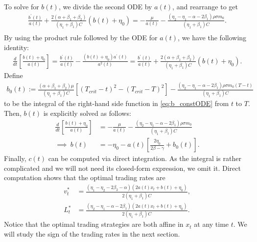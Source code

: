 \documentclass[12pt, letterpaper]{article}
\numberwithin{equation}{section}
\numberwithin{theorem}{section}
\begin{document}
To solve for $b(t)$, we divide the second ODE by $a(t)$,  and rearrange to get
\begin{equation}\label{eq:b_constODE}
	\begin{aligned} 
		\frac{b^\prime(t)}{a(t)}+\frac{2(\alpha+\beta_1+\beta_2)}{(\eta_1+\beta_1)C}(b(t)+\eta_0)=-\frac{\mu}{a(t)}-\frac{(\eta_2-\eta_1-\alpha-2\beta_1)\rho\sigma m_0}{(\eta_1+\beta_1)C}.\\
	\end{aligned}
\end{equation}
By using the product rule followed by the ODE for $a(t)$, we have the following identity:
\begin{equation}\label{eq:ODE_id}
	\begin{aligned} 
		\frac{d}{dt}\left[\frac{b(t)+\eta_0}{a(t)}\right]=\frac{b^\prime(t)}{a(t)}-\frac{\left(b(t)+\eta_0\right)a^\prime(t)}{a^2(t)}=\frac{b^\prime(t)}{a(t)}+\frac{2(\alpha+\beta_1+\beta_2)}{(\eta_1+\beta_1)C}(b(t)+\eta_0).
	\end{aligned}
\end{equation}
Define
\begin{equation*}
\begin{aligned} 
b_0(t):=\frac{(\alpha+\beta_1+\beta_2)\mu}{(\eta_1+\beta_1)C}\left[(T_{crit}-t)^2-(T_{crit}-T)^2\right]-\frac{(\eta_2-\eta_1-\alpha-2\beta_1)\rho\sigma m_0(T-t)}{(\eta_1+\beta_1)C}
\end{aligned}
\end{equation*}
to be the integral of the right-hand side function in \eqref{eq:b_constODE} from $t$ to $T$. Then, $b(t)$ is explicitly solved as follows:
\begin{equation*}
	\begin{aligned} 
		\frac{d}{dt}\left[\frac{b(t)+\eta_0}{a(t)}\right]&=-\frac{\mu}{a(t)}-\frac{(\eta_2-\eta_1-\alpha-2\beta_1)\rho\sigma m_0}{(\eta_1+\beta_1)C}\\
		\implies~b(t)&=-\eta_0-a(t)\left[\frac{2\eta_0}{2\beta-\gamma}+b_0(t)\right].
	\end{aligned}
\end{equation*}
Finally, $c(t)$ can be computed  via direct integration. As the integral is rather complicated and we will not need its closed-form expression, we omit it. Direct computation shows that the optimal trading rates are
\begin{align}
v_t^*&=\frac{(\eta_1-\eta_2-2\beta_2-\alpha)(2a(t)x_t+b(t)+\eta_0)}{2(\eta_1+\beta_1)C},\\
L_t^*&=\frac{(\eta_2-\eta_1-\alpha-2\beta_1)(2a(t)x_t+b(t)+\eta_0)}{2(\eta_1+\beta_1)C}.
\end{align}
Notice that the optimal trading strategies are both affine in $x_t$ at any time $t$. We will study the sign of the trading rates in the next section.
\end{document}
